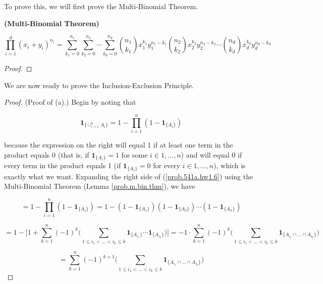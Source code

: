 \begin{theorem}
\begin{proposition}
\end{proposition}

To prove this, we will first prove the Multi-Binomial Theorem.

\begin{lemma}\label{prob.m.bin.thm}\textbf{(Multi-Binomial Theorem)} 

\[
\prod_{i=1}^d (x_i + y_i)^{n_i} = \sum_{k_1=0}^{n_1} \sum_{k_2=0}^{n_2} \cdots \sum_{k_d=0}^{n_d} \binom{n_1}{k_1}x_1^{k_1}y_1^{n_1-k_1} \binom{n_2}{k_2}x_2^{k_2}y_2^{n_2-k_2} \cdots \binom{n_d}{k_d}x_d^{k_d}y_d^{n_d-k_d}
\]

\end{lemma}

\begin{proof}

\end{proof}

We are now ready to prove the Inclusion-Exclusion Principle.

\begin{proof}(Proof of (a).) Begin by noting that 

\begin{equation} \label{prob.541a.hw1.6}
\boldsymbol{1}_{\{\cup_{i=1}^n A_i\}} = 1 - \prod_{i=1}^n (1 - \boldsymbol{1}_{\{A_i\}})
\end{equation}

because the expression on the right will equal 1 if at least one term in the product equals 0 (that is, if \(\boldsymbol{1}_{\{A_i\}} = 1\) for some \(i \in 1, \ldots, n\)) and will equal 0 if every term in the product equals 1 (if \(\boldsymbol{1}_{\{A_i\}} = 0\) for every \(i \in 1, \ldots, n\)), which is exactly what we want. Expanding the right side of (\ref{prob.541a.hw1.6}) using the Multi-Binomial Theorem (Lemma \ref{prob.m.bin.thm}), we have

\[
= 1 - \prod_{i=1}^n (1 - \boldsymbol{1}_{\{A_i\}}) = 1 -  (1 - \boldsymbol{1}_{\{A_1\}}) (1 - \boldsymbol{1}_{\{A_2\}}) \cdots (1 - \boldsymbol{1}_{\{A_n\}})  
\]

\[
 = 1 - \bigg[ 1 + \sum_{k=1}^n (-1)^{k} \bigg( \sum_{1 \leq i_1 < \ldots < i_k \leq k} \boldsymbol{1}_{\{A_{i_1}\}}  \cdots \boldsymbol{1}_{\{A_{i_k}\}}\bigg) \bigg]  = -1 \cdot \sum_{k=1}^n (-1)^{k} \bigg( \sum_{1 \leq i_1 < \ldots < i_k \leq k} \boldsymbol{1}_{\{A_{i_1} \cap \ldots \cap A_{i_k}\}}\bigg) 
\] 

\[
= \sum_{k=1}^n (-1)^{k+1} \bigg( \sum_{1 \leq i_1 < \ldots < i_k \leq k} \boldsymbol{1}_{\{A_{i_1} \cap \ldots \cap A_{i_k}\}}\bigg)
\]


\end{proof}
\end{theorem}
